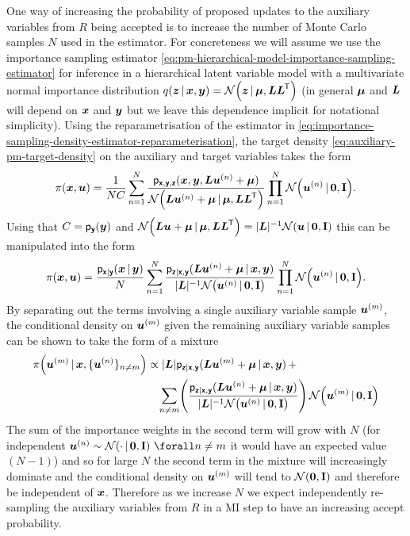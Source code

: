 One way of increasing the probability of proposed updates to the auxiliary variables from $R$ being accepted is to increase the number of Monte Carlo samples $N$ used in the estimator. For concreteness we will assume we use the importance sampling estimator \eqref{eq:pm-hierarchical-model-importance-sampling-estimator} for inference in a hierarchical latent variable model with a multivariate normal importance distribution $q(\vct{z}\gvn\vct{x},\vct{y}) = \nrm{\vct{z}\gvn\vct{\mu},\mtx{L}\mtx{L}\tr}$ (in general $\boldsymbol{\mu}$ and $\boldsymbol{L}$ will depend on $\boldsymbol{x}$ and $\boldsymbol{y}$ but we leave this dependence implicit for notational simplicity). Using the reparametrisation of the estimator in \eqref{eq:importance-sampling-density-estimator-reparameterisation}, the target density \eqref{eq:auxiliary-pm-target-density} on the auxiliary and target variables takes the form
\begin{equation}
  \pi(\vct{x},\vct{u}) = \frac{1}{NC} 
  \sum_{n=1}^N \frac{\pden{\rvct{x},\rvct{y},\rvct{z}}(\vct{x},\vct{y},\mtx{L}\vct{u}^{(n)} + \vct{\mu})}{\nrm{\mtx{L}\vct{u}^{(n)} + \vct{\mu} \gvn \vct{\mu},\mtx{L}\mtx{L}\tr}}
  \prod_{n=1}^N \nrm{\vct{u}^{(n)} \gvn \vct{0},\mathbf{I}}.
\end{equation}
Using that $C = \mathsf{p}_{\boldsymbol{\mathsf{y}}}(\boldsymbol{y})$ and $\nrm{\mtx{L}\vct{u} + \vct{\mu} \gvn \vct{\mu},\mtx{L}\mtx{L}\tr} = |\mtx{L}|^{-1} \nrm{\vct{u} \gvn \vct{0},\mathbf{I}}$ this can be manipulated into the form
\begin{equation*}
  \pi(\vct{x},\vct{u}) = \frac{\pden{\rvct{x}|\rvct{y}}(\vct{x}\gvn\vct{y})}{N} 
  \sum_{n=1}^N \frac{\pden{\rvct{z}|\rvct{x},\rvct{y}}(\mtx{L}\vct{u}^{(n)} + \vct{\mu}\gvn \vct{x},\vct{y})}{|\mtx{L}|^{-1}\nrm{\vct{u}^{(n)} \gvn \vct{0},\mathbf{I}}}
  \prod_{n=1}^N \nrm{\vct{u}^{(n)} \gvn \vct{0},\mathbf{I}}.
\end{equation*}
By separating out the terms involving a single auxiliary variable sample $\boldsymbol{u}^{(m)}$, the conditional density on $\boldsymbol{u}^{(m)}$ given the remaining auxiliary variable samples can be shown to take the form of a mixture
\begin{align}
  \pi\lpa\vct{u}^{(m)} \gvn \vct{x},\lbrace \vct{u}^{(n)} \rbrace_{n\neq m} \rpa &\propto 
  |\mtx{L}|\pden{\rvct{z}|\rvct{x},\rvct{y}}(\mtx{L}\vct{u}^{(m)} + \vct{\mu} \gvn \vct{x},\vct{y}) \,+ \, \\
  \nonumber
  &\phantom{\propto}\,  
  \sum_{n\neq m}\lpa 
  \frac
    {\pden{\rvct{z}|\rvct{x},\rvct{y}}(\mtx{L}\vct{u}^{(n)} + \vct{\mu} \gvn \vct{x},\vct{y})}
    {|\mtx{L}|^{-1}\nrm{\vct{u}^{(n)}\gvn \vct{0},\mathbf{I}}}  
  \rpa \, \nrm{\vct{u}^{(m)}\gvn \vct{0},\mathbf{I}}
\end{align}
The sum of the importance weights in the second term will grow with $N$ (for independent $\vct{u}^{(n)} \sim \nrm{\cdot \gvn \vct{0},\mathbf{I}} ~\forall n \neq m$ it would have an expected value $(N-1)$) and so for large $N$ the second term in the mixture will increasingly dominate and the conditional density on $\boldsymbol{u}^{(m)}$ will tend to $\nrm{\vct{0},\mathbf{I}}$ and therefore be independent of $\boldsymbol{x}$. Therefore as we increase $N$ we expect independently re-sampling the auxiliary variables from $R$ in a \ac{MI} step to have an increasing accept probability. 


